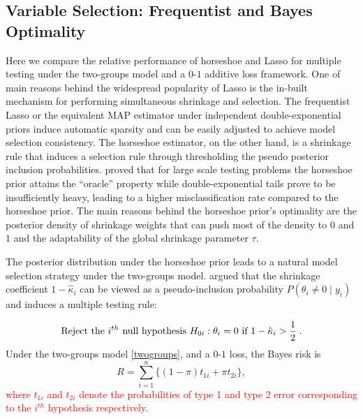\documentclass[sts,preprint]{imsart}
\begin{document}

\subsection{Variable Selection: Frequentist and Bayes Optimality}

Here we compare the relative performance of horseshoe and Lasso for multiple testing under the two-groups model and a $0$-$1$ additive loss framework. One of main reasons behind the widespread popularity of Lasso is the in-built mechanism for performing simultaneous shrinkage and selection. The frequentist
Lasso or the equivalent MAP estimator under independent double-exponential priors induce automatic sparsity and can be easily adjusted to achieve model selection consistency. The horseshoe estimator, on the other hand, is a shrinkage rule that induces a selection rule through thresholding the pseudo posterior inclusion probabilities.  \citet{datta2013asymptotic} proved that for large scale testing problems the horseshoe prior attains the ``oracle'' property while double-exponential tails prove
to be insufficiently heavy, leading to a higher misclassification rate compared to the horseshoe prior. The main reasons behind the horseshoe prior's
optimality are the posterior density of shrinkage weights that can push most of the density to $0$ and $1$ and the adaptability of the global shrinkage
parameter $\tau$. 

The posterior distribution under the horseshoe prior leads to a natural model selection strategy under the two-groups model. \citet{carvalho2010horseshoe} argued that the shrinkage coefficient $1-\hat{\kappa}_i$ can be viewed as a pseudo-inclusion probability $P(\theta_i \ne 0 \mid y_i)$ and induces a
multiple testing rule: 

\begin{equation}
  \text{Reject the $i^{th}$ null hypothesis } H_{0i} : \theta_i = 0 \text{ if }
  1-\hat{\kappa}_i > \frac{1}{2} \;. 
  \label{eq:hsrule}
\end{equation}
Under the two-groups model \eqref{twogroups}, and a $0$-$1$ loss, the Bayes risk is 
\[
R = \sum_{i=1}^{n} \{ (1- \pi) t_{1i} + \pi t_{2i} \}, 
\]
\textcolor{red}{where $t_{1i}$ and $t_{2i}$ denote the probabilities of type 1 and type 2 error corresponding to the $i^{th}$ hypothesis respectively. }  
\end{document}
